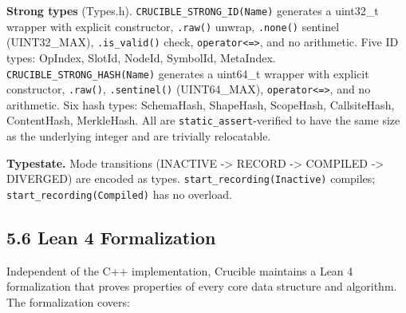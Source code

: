 \textbf{Strong types} (Types.h). \texttt{CRUCIBLE\_STRONG\_ID(Name)} generates a uint32\_t wrapper with explicit constructor, \texttt{.raw()} unwrap, \texttt{.none()} sentinel (UINT32\_MAX), \texttt{.is\_valid()} check, \texttt{operator\textless{}=\textgreater{}}, and no arithmetic. Five ID types: OpIndex, SlotId, NodeId, SymbolId, MetaIndex. \texttt{CRUCIBLE\_STRONG\_HASH(Name)} generates a uint64\_t wrapper with explicit constructor, \texttt{.raw()}, \texttt{.sentinel()} (UINT64\_MAX), \texttt{operator\textless{}=\textgreater{}}, and no arithmetic. Six hash types: SchemaHash, ShapeHash, ScopeHash, CallsiteHash, ContentHash, MerkleHash. All are \texttt{static\_assert}-verified to have the same size as the underlying integer and are trivially relocatable.

\textbf{Typestate.} Mode transitions (INACTIVE -\textgreater{} RECORD -\textgreater{} COMPILED -\textgreater{} DIVERGED) are encoded as types. \texttt{start\_recording(Inactive)} compiles; \texttt{start\_recording(Compiled)} has no overload.

\subsection{5.6 Lean 4 Formalization}\label{lean-4-formalization}

Independent of the C++ implementation, Crucible maintains a Lean 4 formalization that proves properties of every core data structure and algorithm. The formalization covers:

